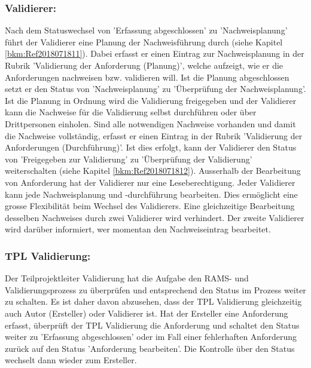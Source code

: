 \subsubsection{Validierer:} 
Nach dem Statuswechsel von 'Erfassung abgeschlossen' zu 'Nachweisplanung' führt der Validierer eine Planung der Nachweisführung durch (siehe Kapitel \ref{bkm:Ref2018071811}). Dabei erfasst er einen Eintrag zur Nachweisplanung in der Rubrik 'Validierung der Anforderung (Planung)', welche aufzeigt, wie er die Anforderungen nachweisen bzw. validieren will. Ist die Planung abgeschlossen setzt er den Status von 'Nachweisplanung' zu 'Überprüfung der Nachweisplanung'. \\

Ist die Planung in Ordnung wird die Validierung freigegeben und der Validierer kann die Nachweise für die Validierung selbst durchführen oder über Drittpersonen einholen. Sind alle notwendigen Nachweise vorhanden und damit die Nachweise vollständig, erfasst er einen Eintrag in der Rubrik 'Validierung der Anforderungen (Durchführung)'. Ist dies erfolgt, kann der Validierer den Status von 'Freigegeben zur Validierung' zu 'Überprüfung der Validierung' weiterschalten (siehe Kapitel \ref{bkm:Ref2018071812}). 
Ausserhalb der Bearbeitung von Anforderung hat der Validierer nur eine Leseberechtigung. Jeder Validierer kann jede Nachweisplanung und -durchführung bearbeiten. Dies ermöglicht eine grosse Flexibilität beim Wechsel des Validierers. Eine gleichzeitige Bearbeitung desselben Nachweises durch zwei Validierer wird verhindert. Der zweite Validierer wird darüber informiert, wer momentan den Nachweiseintrag bearbeitet.

\subsubsection{TPL Validierung:}

Der Teilprojektleiter Validierung hat die Aufgabe den RAMS- und Validierungsprozess zu überprüfen und entsprechend den Status im Prozess weiter zu schalten. Es ist daher davon abzusehen, dass der TPL Validierung gleichzeitig auch Autor (Ersteller) oder Validierer ist. Hat der Ersteller eine Anforderung erfasst, überprüft der TPL Validierung die Anforderung und schaltet den Status weiter zu 'Erfassung abgeschlossen' oder im Fall einer fehlerhaften Anforderung zurück auf den Status 'Anforderung bearbeiten'. Die Kontrolle über den Status wechselt dann wieder zum Ersteller. \\

